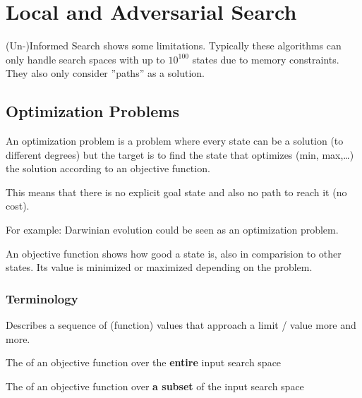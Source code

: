 \documentclass[
../../EiKI_Summary.tex,
]
{subfiles}
\begin{document}
\section{Local and Adversarial Search}
(Un-)Informed Search shows some limitations. Typically these algorithms can only handle search spaces with up to $10^{100}$ states due to memory constraints. They also only consider ''paths'' as a solution.

\subsection{Optimization Problems}
\begin{defbox*}
    An optimization problem is a problem where every state can be a solution (to different degrees) but the target is to find the state that optimizes (min, max,\dots) the solution according to an objective function. 

    This means that there is no explicit goal state and also no path to reach it (no cost).

    For example: Darwinian evolution could be seen as an optimization problem.
\end{defbox*}

\begin{defbox}
    An objective function shows how good a state is, also in comparision to other states. Its value is minimized or maximized depending on the problem.
\end{defbox}

\subsubsection{Terminology}
\begin{defbox}
    [Convergence]
    Describes a sequence of (function) values that approach a limit / value more and more.
\end{defbox}

\begin{minipage}
    [t]{0.5\textwidth}
    \begin{defbox}
        The  of an objective function over the \textbf{entire} input search space
    \end{defbox}
\end{minipage}
\begin{minipage}
    [t]{0.5\textwidth}
    \begin{defbox}
        The  of an objective function over \textbf{a subset} of the input search space
    \end{defbox}
\end{minipage}
\end{document}
